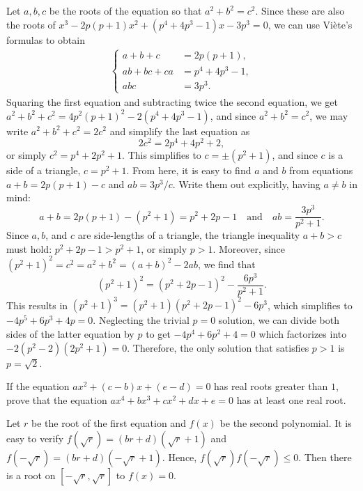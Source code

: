 \documentclass[12pt,a4paper]{memoir}
\theoremstyle{definition}
\begin{document}
\begin{solution}[name={Solution by Amir Parvardi}]
	Let $a,b,c$ be the roots of the equation so that $a^2+b^2=c^2$. Since these are also the roots of $x^3 -2p(p+1)x^2+(p^4 +4p^3 -1)x-3p^3 = 0$, we can use Viète's formulas to obtain
	\begin{align*}
		\begin{cases}
			a+b+c &= 2p(p+1),\\
			ab+bc+ca &= p^4+4p^3-1,\\
			abc &= 3p^3.
		\end{cases}
	\end{align*}
	Squaring the first equation and subtracting twice the second equation, we get $a^2+b^2+c^2=4p^2(p+1)^2 - 2(p^4+4p^3-1)$, and since $a^2+b^2=c^2$, we may write $a^2+b^2+c^2=2c^2$ and simplify the last equation as \[2c^2 = 2 p^4 + 4 p^2 + 2,\] or simply $c^2=p^4+2p^2+1$. This simplifies to $c=\pm(p^2+1)$, and since $c$ is a side of a triangle, $c=p^2+1$. From here, it is easy to find $a$ and $b$ from equations $a+b = 2p(p+1)-c$ and $ab=3p^3/c$. Write them out explicitly, having $a\neq b$ in mind:
	\[a+b = 2p(p+1) - (p^2+1) = p^2 +2p - 1 \quad \text{and} \quad ab = \frac{3p^3}{p^2+1}.\]
	Since $a,b$, and $c$ are side-lengths of a triangle, the triangle inequality $a+b>c$ must hold: $p^2+2p-1 > p^2+1$, or simply $p>1$. Moreover, since $(p^2+1)^2=c^2=a^2+b^2=(a+b)^2-2ab$, we find that \[(p^2+1)^2 = ( p^2 +2p - 1)^2 - \frac{6p^3}{p^2+1}.\]
	This results in $(p^2+1)^3 = (p^2+1)( p^2 +2p - 1)^2 - 6p^3$, which simplifies to $-4 p^5 + 6 p^3 + 4 p = 0$. Neglecting the trivial $p=0$ solution, we can divide both sides of the latter equation by $p$ to get $-4p^4+6p^2+4=0$ which factorizes into $-2 (p^2 - 2) (2 p^2 + 1) = 0$. Therefore, the only solution that satisfies $p>1$ is $\boxed{p=\sqrt 2}$.
\end{solution}


\begin{question}[name={1995 Greece}]
	If the equation $ax^2+(c-b)x+(e-d)=0$ has real roots greater than $1$, prove that the equation $ax^4+bx^3+cx^2+dx+e=0$ has at least one real root.
\end{question}

\begin{solution}
	Let $ r$ be the root of the first equation and $ f(x)$ be the second polynomial.
	It is easy to verify $f(\sqrt r)=(br+d)(\sqrt r+1)$ and $f(-\sqrt r)=(br+d)(-\sqrt r+1)$.
	Hence, $f(\sqrt r)f(-\sqrt r)\leq 0$. Then there is a root on $[-\sqrt r,\sqrt r]$ to $f(x)=0$.
\end{solution}
\end{document}

